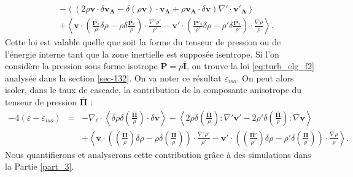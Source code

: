 \begin{equation}
{\begin{array}{lcl}
 &&- \left<\left(2\rho \boldsymbol{v} \cdot \delta \boldsymbol{v_A} - \delta \left(\rho \boldsymbol{v}\right) \cdot \boldsymbol{v_A} +  \rho \boldsymbol{v_A} \cdot \delta \boldsymbol{v} \right)\nabla' \cdot \boldsymbol{v'_A}\right> \\
&& +  \left< \boldsymbol{v} \cdot \left(  \frac{ \overline{\boldsymbol{P_*}} }{\rho} \delta \rho - \rho \delta \frac{ \overline{\boldsymbol{P_*}} }{\rho}  \right)\cdot  \frac{\nabla' \rho'}{\rho'} - \boldsymbol{v'} \cdot \left(  \frac{ \overline{\boldsymbol{P'_*}} }{\rho'} \delta \rho - \rho' \delta \frac{ \overline{\boldsymbol{P_*}} }{\rho}  \right)\cdot  \frac{\nabla \rho}{\rho}  \right>.
\end{array}}
\end{equation}
Cette loi est valable quelle que soit la forme du tenseur de pression ou de l'énergie interne tant que la zone inertielle est supposée isentrope. Si l'on considère la pression sous forme isotrope $\overline{\boldsymbol{P}} = p \overline{\boldsymbol{I}}$, on trouve la loi \eqref{eq:turb_elg_f2} analysée dans la section \ref{sec-132}. On va noter ce résultat $\varepsilon_{iso}$. On peut alors isoler, dans le taux de cascade, la contribution de la composante anisotrope du tenseur de pression $\overline{\boldsymbol{\Pi}}$ : 
\begin{equation}
\label{eq:turb_cpgyr_an} \boxed{
\begin{array}{lcl}
- 4\left(\varepsilon - \varepsilon_{iso}\right) &=& - \nabla_{\boldsymbol{\ell}} \cdot \left< \delta \rho \delta \left(\frac{\overline{\boldsymbol{\Pi}}}{\rho}\right) \cdot \delta \boldsymbol{v} \right>  -\left< 2\rho \delta \left(\frac{\overline{\boldsymbol{\Pi}}}{\rho}\right):\nabla' \boldsymbol{v'} -  2\rho' \delta \left(\frac{\overline{\boldsymbol{\Pi}}}{\rho}\right) :\nabla  \boldsymbol{v}\right>\\
&& +  \left< \boldsymbol{v} \cdot \left(  \left(\frac{\overline{\boldsymbol{\Pi}}}{\rho}\right) \delta \rho - \rho \delta \left(\frac{\overline{\boldsymbol{\Pi}}}{\rho}\right)  \right)\cdot  \frac{\nabla' \rho'}{\rho'}-\boldsymbol{v'} \cdot \left(  \left(\frac{\overline{\boldsymbol{\Pi'}}}{\rho'}\right) \delta \rho - \rho' \delta \left(\frac{\overline{\boldsymbol{\Pi}}}{\rho}\right)  \right)\cdot  \frac{\nabla \rho}{\rho}  \right>.
\end{array}}
\end{equation}
Nous quantifierons et analyserons cette contribution grâce à des simulations dans la Partie \ref{part_3}. 

